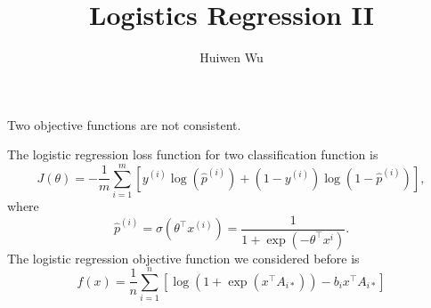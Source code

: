 \documentclass[11pt, oneside]{article}   	%
\title{Logistics Regression II}
\author{Huiwen Wu}
\begin{document}
\maketitle
Two objective functions are not consistent. 

The logistic regression loss function for two classification function is 
$$
J(\theta) = - \frac{1}{m} \sum_{i=1}^m [y^{(i)} \log (\hat{p}^{(i)}) + 
(1 - y^{(i)}) \log(1 - \hat{p}^{(i)})],
$$
where 
$$
\hat{p}^{(i)} = \sigma (\theta^{\intercal} x^{(i)}) = \frac{1}{1 + \exp(- \theta^{\intercal} x^{i})}.
$$
The logistic regression objective function we considered before is 
$$
f(x) = \frac{1}{n} \sum_{i=1}^n [\log(1 + \exp(x^{\intercal} A_{i*})) - b_i x^{\intercal} A_{i*}] 
$$
\end{document}
